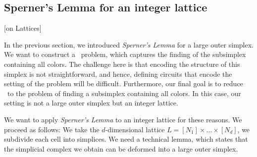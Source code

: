 \subsection{Sperner's Lemma for an integer lattice}[on Lattices]

In the previous section, we introduced \textit{Sperner's Lemma} for a large outer simplex. We want to construct a \TFNP\ problem, which captures the finding of the subsimplex containing all colors. The challenge here is that encoding the structure of this simplex is not straightforward, and hence, defining circuits that encode the setting of the problem will be difficult. Furthermore, our final goal is to reduce \Tarskistar\ to the problem of finding a subsimplex containing all colors. In this case, our setting is not a large outer simplex but an integer lattice.

We want to apply \textit{Sperner's Lemma} to an integer lattice for these reasons. We proceed as follows: We take the $d$-dimensional lattice $L = [N_1] \times \dots \times [N_d]$, we subdivide each cell into simplices. We need a technical lemma, which states that the simplicial complex we obtain can be deformed into a large outer simplex.

